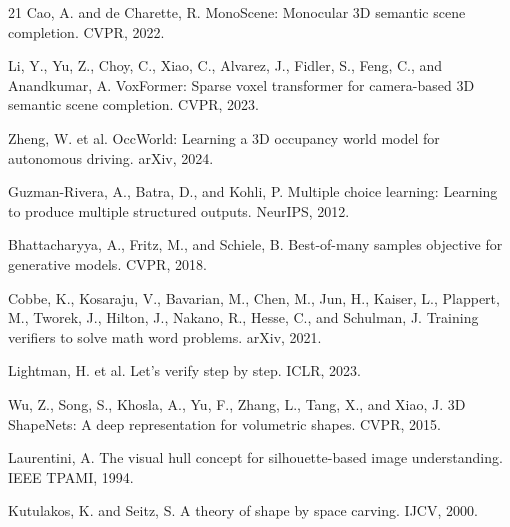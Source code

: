 \documentclass{article}
\begin{document}
\begin{thebibliography}{21}
Cao, A. and de Charette, R.
MonoScene: Monocular 3D semantic scene completion. CVPR, 2022.

Li, Y., Yu, Z., Choy, C., Xiao, C., Alvarez, J., Fidler, S., Feng, C., and Anandkumar, A.
VoxFormer: Sparse voxel transformer for camera-based 3D semantic scene completion. CVPR, 2023.

Zheng, W. et al.
OccWorld: Learning a 3D occupancy world model for autonomous driving. arXiv, 2024.

Guzman-Rivera, A., Batra, D., and Kohli, P.
Multiple choice learning: Learning to produce multiple structured outputs. NeurIPS, 2012.

Bhattacharyya, A., Fritz, M., and Schiele, B.
Best-of-many samples objective for generative models. CVPR, 2018.

Cobbe, K., Kosaraju, V., Bavarian, M., Chen, M., Jun, H., Kaiser, L., Plappert, M., Tworek, J., Hilton, J., Nakano, R., Hesse, C., and Schulman, J.
Training verifiers to solve math word problems. arXiv, 2021.

Lightman, H. et al.
Let's verify step by step. ICLR, 2023.

Wu, Z., Song, S., Khosla, A., Yu, F., Zhang, L., Tang, X., and Xiao, J.
3D ShapeNets: A deep representation for volumetric shapes. CVPR, 2015.

Laurentini, A.
The visual hull concept for silhouette-based image understanding. IEEE TPAMI, 1994.

Kutulakos, K. and Seitz, S.
A theory of shape by space carving. IJCV, 2000.

\end{thebibliography}
\end{document}

